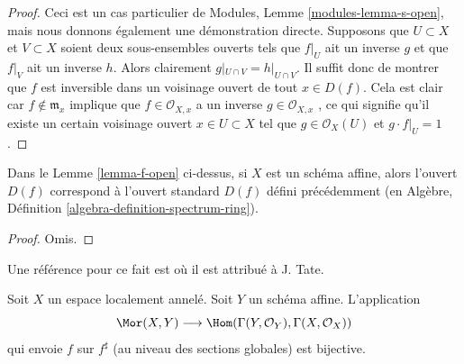 \begin{proof}
Ceci est un cas particulier de Modules, Lemme  \ref{modules-lemma-s-open}, mais nous donnons
également une démonstration directe. Supposons que  $U \subset X$  et  $V \subset X$ 
soient deux sous-ensembles ouverts tels que  $f|_U$  ait un inverse  $g$ 
et que  $f|_V$  ait un inverse  $h$. Alors clairement  $g|_{U\cap V} = h|_{U\cap V}$. Il
suffit donc de montrer que  $f$  est inversible dans un voisinage ouvert de
tout  $x \in D(f)$. Cela est clair car  $f \not \in \mathfrak m_x$  implique que  $f \in \mathcal{O}_{X, x}$  a un
inverse  $g \in \mathcal{O}_{X, x}$ , ce qui signifie qu'il existe un certain voisinage ouvert
 $x \in U \subset X$  tel que  $g \in \mathcal{O}_X(U)$  et  $g\cdot f|_U = 1$.
\end{proof}

\begin{lemma}
\label{lemma-f-open-affine}
Dans le Lemme  \ref{lemma-f-open}  ci-dessus, si  $X$  est un schéma affine, alors
l'ouvert  $D(f)$  correspond à l'ouvert standard  $D(f)$  défini
précédemment (en Algèbre, Définition  \ref{algebra-definition-spectrum-ring}).
\end{lemma}

\begin{proof}
Omis.
\end{proof}

\begin{lemma}
\label{lemma-morphism-into-affine}
\begin{reference}
Une référence pour ce fait est  \cite[II, Err 1, Prop. 1.8.1]{EGA}  où il est attribué à J. Tate.
\end{reference}
Soit  $X$  un espace localement annelé. Soit  $Y$  un schéma affine.
L'application
$$
\Mor(X, Y)
\longrightarrow
\Hom(\Gamma(Y, \mathcal{O}_Y), \Gamma(X, \mathcal{O}_X))
$$
qui envoie  $f$  sur  $f^\sharp$  (au niveau des sections globales) est
bijective.
\end{lemma}


